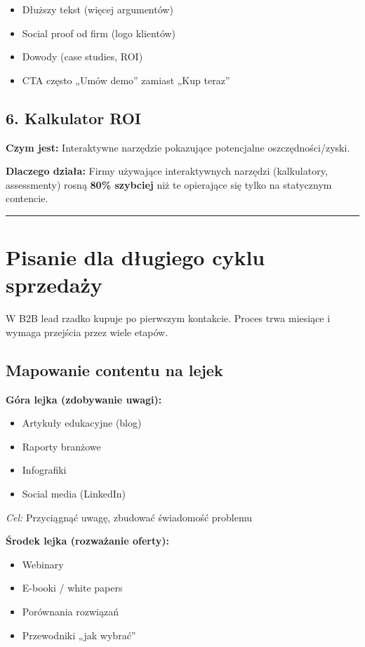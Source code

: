 \documentclass[
  12pt,
  a4paper,
  twoside,
  openright,
  12pt,
  DIV=12,
  BCOR=12mm]{scrbook}
\providecommand{\tightlist}{%
  \setlength{\itemsep}{0pt}\setlength{\parskip}{0pt}}\usepackage{longtable,booktabs,array}
\newcommand{\decoline}{%
  \begin{center}
    \textcolor{bordergray}{\rule{0.3\textwidth}{0.5pt}}
  \end{center}
}
\begin{document}
\begin{itemize}
\tightlist
\item
  Dłuższy tekst (więcej argumentów)
\item
  Social proof od firm (logo klientów)
\item
  Dowody (case studies, ROI)
\item
  CTA często „Umów demo'' zamiast „Kup teraz''
\end{itemize}

\subsection{6. Kalkulator ROI}\label{kalkulator-roi}

\textbf{Czym jest:} Interaktywne narzędzie pokazujące potencjalne
oszczędności/zyski.

\textbf{Dlaczego działa:} Firmy używające interaktywnych narzędzi
(kalkulatory, assessmenty) rosną \textbf{80\% szybciej} niż te
opierające się tylko na statycznym contencie.

\decoline

\section{Pisanie dla długiego cyklu
sprzedaży}\label{pisanie-dla-dux142ugiego-cyklu-sprzedaux17cy}

W B2B lead rzadko kupuje po pierwszym kontakcie. Proces trwa miesiące i
wymaga przejścia przez wiele etapów.

\subsection{Mapowanie contentu na
lejek}\label{mapowanie-contentu-na-lejek}

\textbf{Góra lejka (zdobywanie uwagi):}

\begin{itemize}
\tightlist
\item
  Artykuły edukacyjne (blog)
\item
  Raporty branżowe
\item
  Infografiki
\item
  Social media (LinkedIn)
\end{itemize}

\emph{Cel:} Przyciągnąć uwagę, zbudować świadomość problemu

\textbf{Środek lejka (rozważanie oferty):}

\begin{itemize}
\tightlist
\item
  Webinary
\item
  E-booki / white papers
\item
  Porównania rozwiązań
\item
  Przewodniki „jak wybrać''
\end{itemize}
\end{document}
